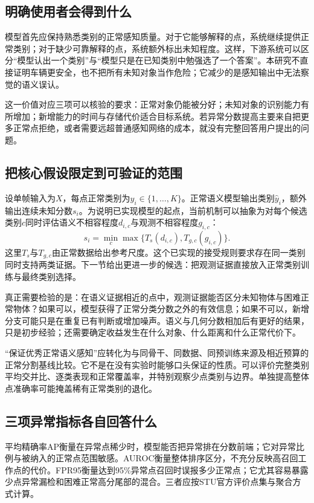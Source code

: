 \documentclass[11pt,a4paper]{article}
\begin{document}
\subsection{明确使用者会得到什么}

模型首先应保持熟悉类别的正常感知质量。对于它能够解释的点，系统继续提供正常类别；对于缺少可靠解释的点，系统额外标出未知程度。这样，下游系统可以区分“模型认出一个类别”与“模型只是在已知类别中勉强选了一个答案”。本研究不直接证明车辆更安全，也不把所有未知对象当作危险；它减少的是感知输出中无法察觉的语义误认。

这一价值对应三项可以核验的要求：正常对象仍能被分好；未知对象的识别能力有所增加；新增能力的时间与存储代价适合目标系统。若异常分数提高主要来自把更多正常点拒绝，或者需要远超普通感知网络的成本，就没有完整回答用户提出的问题。

\subsection{把核心假设限定到可验证的范围}

设单帧输入为$X$，每点正常类别为$y_i\in\{1,\ldots,K\}$。正常语义模型输出类别$\hat y_i$，额外输出连续未知分数$s_i$。为说明已实现模型的起点，当前机制可以抽象为对每个候选类别$c$同时评估语义不相容程度$d_{i,c}$与观测不相容程度$g_{i,c}$：
\[
s_i=\min_c\max\{T_s(d_{i,c}),T_{g,c}(g_{i,c})\}.
\]
这里$T_s$与$T_{g,c}$由正常数据给出参考尺度。这个已实现的接受规则要求存在同一类别同时支持两类证据。下一节给出更进一步的候选：把观测证据直接放入正常类别训练与最终类别选择。

真正需要检验的是：在语义证据相近的点中，观测证据能否区分未知物体与困难正常物体？如果可以，模型获得了正常分类分数之外的有效信息；如果不可以，新增分支可能只是在重复已有判断或增加噪声。语义与几何分数相加后有更好的结果，只是初步经验；还需要确定收益发生在什么对象、什么距离和什么正常代价下。

“保证优秀正常语义感知”应转化为与同骨干、同数据、同预训练来源及相近预算的正常分割基线比较。它不是在没有实验时能够口头保证的性质。可以评价完整类别平均交并比、逐类表现和正常覆盖率，并特别观察少点类别与边界。单独提高整体点准确率可能掩盖稀有正常类别的退化。

\subsection{三项异常指标各自回答什么}

平均精确率AP衡量在异常点稀少时，模型能否把异常排在分数前端；它对异常比例与被纳入的正常点范围敏感。AUROC衡量整体排序区分，不充分反映高召回工作点的代价。FPR95衡量达到95\%异常点召回时误报多少正常点；它尤其容易暴露少点异常漏检和困难正常高分尾部的混合。三者应按STU官方评价点集与聚合方式计算。
\end{document}
